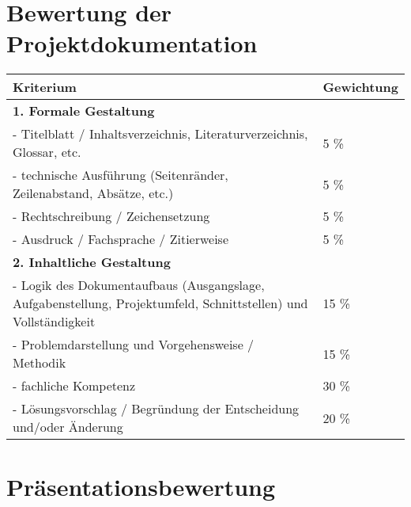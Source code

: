 \section*{Bewertung der Projektdokumentation}

\begin{longtable}[]{@{}p{}p{}@{}}
\toprule
\textbf{Kriterium} & \textbf{Gewichtung} \\
\midrule
\endhead
\textbf{1. Formale Gestaltung} & \\
- Titelblatt / Inhaltsverzeichnis, Literaturverzeichnis, Glossar, etc. & 5 \% \\
- technische Ausführung (Seitenränder, Zeilenabstand, Absätze, etc.) & 5 \% \\
- Rechtschreibung / Zeichensetzung & 5 \% \\
- Ausdruck / Fachsprache / Zitierweise & 5 \% \\
\textbf{2. Inhaltliche Gestaltung} & \\
- Logik des Dokumentaufbaus (Ausgangslage, Aufgabenstellung, Projektumfeld, Schnittstellen) und Vollständigkeit & 15 \% \\
- Problemdarstellung und Vorgehensweise / Methodik & 15 \% \\
- fachliche Kompetenz & 30 \% \\
- Lösungsvorschlag / Begründung der Entscheidung und/oder Änderung & 20 \% \\
\end{longtable}

\section*{Präsentationsbewertung}


